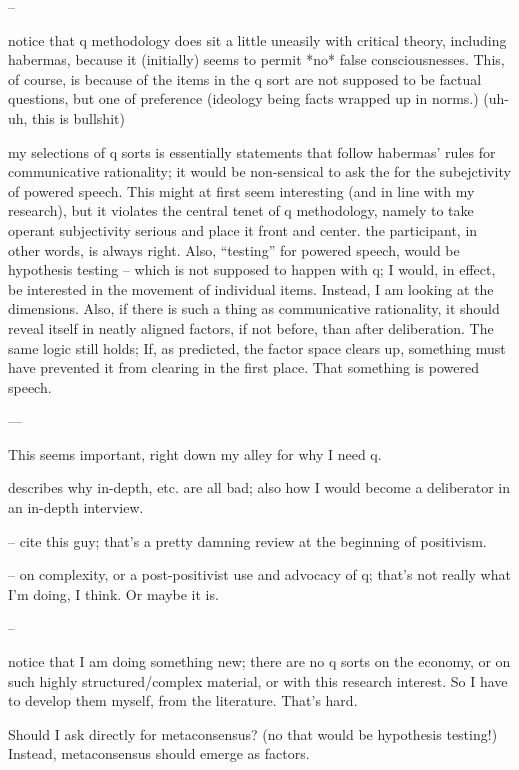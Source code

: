 --

notice that q methodology does sit a little uneasily with critical theory, including habermas, because it (initially) seems to permit *no* false consciousnesses.
This, of course, is because of the items in the q sort are not supposed to be factual questions, but one of preference (ideology being facts wrapped up in norms.) (uh-uh, this is bullshit)

my selections of q sorts is essentially statements that follow habermas' rules for communicative rationality; it would be non-sensical to ask the for the subejctivity of powered speech.
This might at first seem interesting (and in line with my research), but it violates the central tenet of q methodology, namely to take operant subjectivity serious and place it front and center.
the participant, in other words, is always right.
Also, ``testing'' for powered speech, would be hypothesis testing – which is not supposed to happen with q; I would, in effect, be interested in the movement of individual items.
Instead, I am looking at the dimensions.
Also, if there is such a thing as communicative rationality, it should reveal itself in neatly aligned factors, if not before, than after deliberation.
The same logic still holds; If, as predicted, the factor space clears up, something must have prevented it from clearing in the first place. That something is powered speech.

---

\cite{dryzek2005handle} This seems important, right down my alley for why I need q.

describes why in-depth, etc. are all bad; also how I would become a deliberator in an in-depth interview.

--
\cite{Durning1999} cite this guy; that's a pretty damning review at the beginning of positivism.

--
\cite{hutchinson2012} on complexity, or a post-positivist use and advocacy of q; that's not really what I'm doing, I think. Or maybe it is.

--
\cite{Niemeyer-2011-bookchap}

notice that I am doing something new; there are no q sorts on the economy, or on such highly structured/complex material, or with this research interest.
So I have to develop them myself, from the literature. That's hard.

Should I ask directly for metaconsensus? (no that would be hypothesis testing!) Instead, metaconsensus should emerge as factors.

